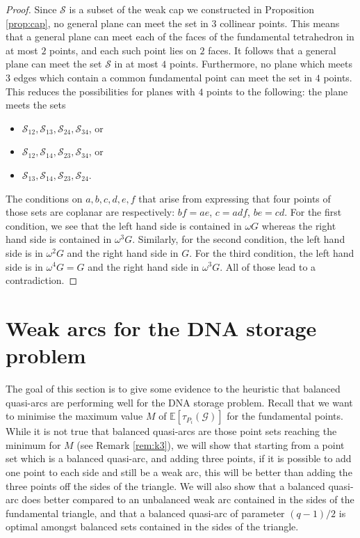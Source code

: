 \documentclass{article}
\newcommand{\Gscr}{\mathscr{G}}
\newcommand{\E}{\mathbb{E}}
\begin{document}
\begin{proof} Since $\mathcal{S}$ is a subset of the weak cap we constructed in Proposition \ref{prop:cap}, no general plane can meet the set in $3$ collinear points. This means that a general plane can meet each of the faces of the fundamental tetrahedron in at most $2$ points, and each such point lies on $2$ faces. It follows that a general plane can meet the set $\mathcal{S}$ in at most $4$ points. Furthermore, no plane which meets $3$ edges which contain a common fundamental point can meet the set in $4$ points.
This reduces the possibilities for planes with $4$ points to the following: the plane meets the sets
\begin{itemize}
\item $\mathcal{S}_{12},\mathcal{S}_{13},\mathcal{S}_{24},\mathcal{S}_{34}$, or
\item $\mathcal{S}_{12},\mathcal{S}_{14},\mathcal{S}_{23},\mathcal{S}_{34}$, or
\item $\mathcal{S}_{13},\mathcal{S}_{14},\mathcal{S}_{23},\mathcal{S}_{24}.$
\end{itemize}

The conditions on $a,b,c,d,e,f$ that arise from expressing that four points of those sets are coplanar are respectively:
$bf=ae$, $c=adf$, $be=cd$.
For the first condition, we see that the left hand side is contained in $\omega G$ whereas the right hand side is contained in $\omega^3 G$. Similarly, for the second condition, the left hand side is in $\omega^2 G$ and the right hand side in $G$. For the third condition, the left hand side is in $\omega^4G=G$ and the right hand side in $\omega^3G$. All of those lead to a contradiction.
\end{proof}





\section{Weak arcs for the DNA storage problem}\label{sec:arcDNA}
The goal of this section is to give some evidence to the heuristic that balanced quasi-arcs are performing well for the DNA storage problem. Recall that we want to minimise the maximum value $M$ of $\E[\tau_{P_i}(\Gscr)]$ for the fundamental points. While it is not true that balanced quasi-arcs are those point sets reaching the minimum for $M$ (see Remark \ref{rem:k3}), we will show that starting from a point set which is a balanced quasi-arc, and adding three points, if it is possible to add one point to each side and still be a weak arc, this will be better than adding the three points off the sides of the triangle. 
We will also show that a balanced quasi-arc does better compared to an unbalanced weak arc contained in the sides of the fundamental triangle, and that a balanced quasi-arc of parameter $(q-1)/2$ is optimal amongst balanced sets contained in the sides of the triangle. 
\end{document}
